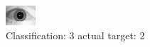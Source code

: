 \begin{figure}[h!]
\begin{center}
\includegraphics[width=0.60\columnwidth]{figures/ID1701_class_3_target_2.png}
\end{center}
\caption{ Classification: 3 actual target: 2}
\label{fig:ID1701_class_3_target_2}
\end{figure}
